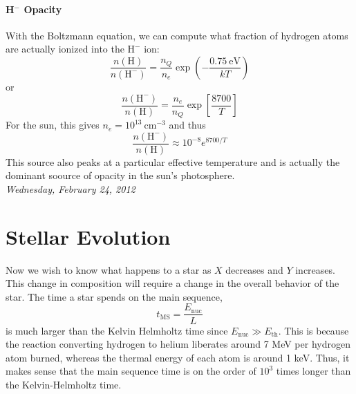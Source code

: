 \documentclass[10pt]{article}
\numberwithin{equation}{section}
\newcommand{\n}{\noindent}
\begin{document}
    \paragraph{H${}^-$ Opacity}
    \label{par:mathrmh--opacity}
    With the Boltzmann equation, we can compute what fraction of
    hydrogen atoms are actually ionized into the $\mathrm{H}^-$ ion:
    \begin{equation}
      \label{eq:222}
      \frac{n(\mathrm{H})}{n(\mathrm{H}^-)}=\frac{n_Q}{n_e}\exp\left(-\frac{0.75\ \mathrm{eV}}{kT}\right)
    \end{equation}
    or
    \begin{equation}
      \label{eq:223}
      \frac{n(\mathrm{H^-})}{n(\mathrm{H})}=\frac{n_e}{n_Q}\exp\left[\frac{8700}{T}\right]
    \end{equation}
    For the sun, this gives $n_e=10^{13}\ \mathrm{cm^{-3}}$ and thus
    \begin{equation}
      \label{eq:224}
      \frac{n(\mathrm{H}^-)}{n(\mathrm{H})}\approx 10^{-8}e^{8700/T}
    \end{equation}
    This source also peaks at a particular effective temperature and
    is actually the dominant soource of opacity in the sun's
    photosphere.\\

    \n \textit{Wednesday, February 24, 2012}

    \section{Stellar Evolution}
    
    Now we wish to know what happens to a star as $X$ decreases and
    $Y$ increases.  This change in composition will require a change
    in the overall behavior of the star. The time a star spends on the
    main sequence,
    \begin{equation}
      \label{eq:226}
      t_{\mathrm{MS}}=\frac{E_{\mathrm{nuc}}}{L}
    \end{equation}
    is much larger than the Kelvin Helmholtz time since
    $E_{\mathrm{nuc}}\gg E_{\mathrm{th}}$. This is because the
    reaction converting hydrogen to helium liberates around 7 MeV per
    hydrogen atom burned, whereas the thermal energy of each atom is
    around 1 keV. Thus, it makes sense that the main sequence time is
    on the order of $10^3$ times longer than the Kelvin-Helmholtz
    time.\\
\end{document}
